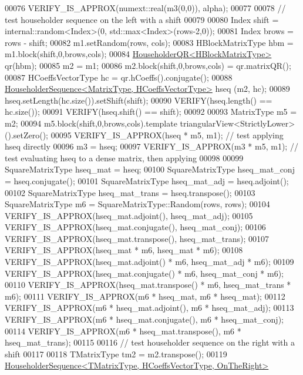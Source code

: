 \begin{DoxyCode}
00076   VERIFY\_IS\_APPROX(numext::real(m3(0,0)), alpha);
00077 
00078   \textcolor{comment}{// test householder sequence on the left with a shift}
00079 
00080   Index shift = internal::random<Index>(0, std::max<Index>(rows-2,0));
00081   Index brows = rows - shift;
00082   m1.setRandom(rows, cols);
00083   HBlockMatrixType hbm = m1.block(shift,0,brows,cols);
00084   \hyperlink{group___q_r___module_class_eigen_1_1_householder_q_r}{HouseholderQR<HBlockMatrixType>} qr(hbm);
00085   m2 = m1;
00086   m2.block(shift,0,brows,cols) = qr.matrixQR();
00087   HCoeffsVectorType hc = qr.hCoeffs().conjugate();
00088   \hyperlink{group___householder___module_class_eigen_1_1_householder_sequence}{HouseholderSequence<MatrixType, HCoeffsVectorType>} hseq
      (m2, hc);
00089   hseq.setLength(hc.size()).setShift(shift);
00090   VERIFY(hseq.length() == hc.size());
00091   VERIFY(hseq.shift() == shift);
00092   
00093   MatrixType m5 = m2;
00094   m5.block(shift,0,brows,cols).template triangularView<StrictlyLower>().setZero();
00095   VERIFY\_IS\_APPROX(hseq * m5, m1); \textcolor{comment}{// test applying hseq directly}
00096   m3 = hseq;
00097   VERIFY\_IS\_APPROX(m3 * m5, m1); \textcolor{comment}{// test evaluating hseq to a dense matrix, then applying}
00098   
00099   SquareMatrixType hseq\_mat = hseq;
00100   SquareMatrixType hseq\_mat\_conj = hseq.conjugate();
00101   SquareMatrixType hseq\_mat\_adj = hseq.adjoint();
00102   SquareMatrixType hseq\_mat\_trans = hseq.transpose();
00103   SquareMatrixType m6 = SquareMatrixType::Random(rows, rows);
00104   VERIFY\_IS\_APPROX(hseq\_mat.adjoint(),    hseq\_mat\_adj);
00105   VERIFY\_IS\_APPROX(hseq\_mat.conjugate(),  hseq\_mat\_conj);
00106   VERIFY\_IS\_APPROX(hseq\_mat.transpose(),  hseq\_mat\_trans);
00107   VERIFY\_IS\_APPROX(hseq\_mat * m6,             hseq\_mat * m6);
00108   VERIFY\_IS\_APPROX(hseq\_mat.adjoint() * m6,   hseq\_mat\_adj * m6);
00109   VERIFY\_IS\_APPROX(hseq\_mat.conjugate() * m6, hseq\_mat\_conj * m6);
00110   VERIFY\_IS\_APPROX(hseq\_mat.transpose() * m6, hseq\_mat\_trans * m6);
00111   VERIFY\_IS\_APPROX(m6 * hseq\_mat,             m6 * hseq\_mat);
00112   VERIFY\_IS\_APPROX(m6 * hseq\_mat.adjoint(),   m6 * hseq\_mat\_adj);
00113   VERIFY\_IS\_APPROX(m6 * hseq\_mat.conjugate(), m6 * hseq\_mat\_conj);
00114   VERIFY\_IS\_APPROX(m6 * hseq\_mat.transpose(), m6 * hseq\_mat\_trans);
00115 
00116   \textcolor{comment}{// test householder sequence on the right with a shift}
00117 
00118   TMatrixType tm2 = m2.transpose();
00119   \hyperlink{group___householder___module_class_eigen_1_1_householder_sequence}{HouseholderSequence<TMatrixType, HCoeffsVectorType, OnTheRight>}

\end{DoxyCode}
